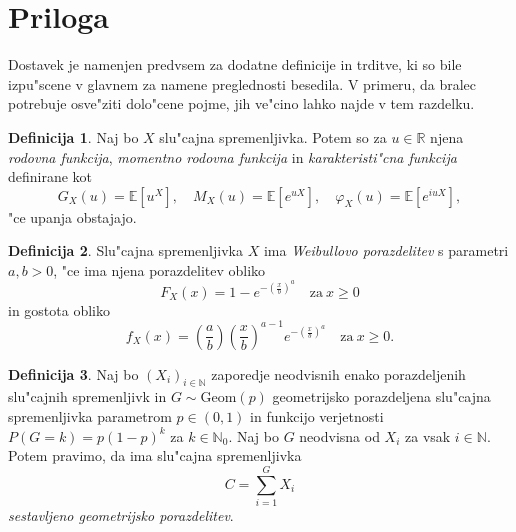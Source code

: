 \documentclass[12pt, a4paper, reqno]{amsart}
\theoremstyle{definition}
\newtheorem{definicija}{Definicija}[section]
\theoremstyle{plain}
\newcommand{\R}{\mathbb{R}}
\newcommand{\N}{\mathbb{N}}
\newcommand{\E}{\mathbb{E}}
\newcommand{\1}{\mathds{1}}
\begin{document}
        
        
        





\pagebreak

\section{Priloga}
    Dostavek je namenjen predvsem za dodatne definicije in trditve, ki so bile izpu"scene v glavnem
    za namene preglednosti besedila. V primeru, da bralec potrebuje osve"ziti dolo"cene pojme, 
    jih ve"cino lahko najde v tem razdelku.
    \begin{definicija}
        Naj bo $X$ slu"cajna spremenljivka. Potem so za $u\in\R$ njena \textit{rodovna funkcija}, 
        \textit{momentno rodovna funkcija} in \textit{karakteristi"cna funkcija} definirane 
        kot 
        \begin{equation*}
            G_X(u) = \E\left[u^X\right], \quad M_X(u) = \E\left[e^{uX}\right], \quad \varphi_X(u) = \E\left[e^{iuX}\right],
        \end{equation*}
        "ce upanja obstajajo.
        \label{def:rodovneFunkcije}
    \end{definicija}

    \begin{definicija}
        Slu"cajna spremenljivka $X$ ima \textit{Weibullovo porazdelitev} s parametri $a, b > 0$, 
        "ce ima njena porazdelitev obliko 
        \begin{equation*}
            F_X(x) = 1 - e^{-\left(\tfrac{x}{b}\right)^a} \quad \text{za} \ x\geq 0
        \end{equation*}
        in gostota obliko
        \begin{equation*}
            f_X(x) = \left(\frac{a}{b}\right)\left(\frac{x}{b}\right)^{a-1}e^{-\left(\tfrac{x}{b}\right)^a} \quad \text{za} \ x\geq 0.
        \end{equation*}
        \label{def:WeibullovaPorazdelitev}
    \end{definicija}

    \begin{definicija}
        Naj bo $(X_i)_{i\in\N}$ zaporedje neodvisnih enako porazdeljenih slu"cajnih spremenljivk in 
        $G \sim \text{Geom}(p)$ geometrijsko porazdeljena slu"cajna spremenljivka  parametrom $p\in(0, 1)$ in 
        funkcijo verjetnosti $P(G = k) = p(1 - p)^{k}$ za $k\in\N_0$.
        Naj bo $G$ neodvisna od $X_i$ za vsak $i\in\N$. Potem pravimo, da ima slu"cajna spremenljivka
        \begin{equation*}
            C = \sum_{i= 1}^{G} X_i
        \end{equation*}
        \textit{sestavljeno geometrijsko porazdelitev}.
        \label{def:CompoundGeometricDistribution}
    \end{definicija}
\end{document}
